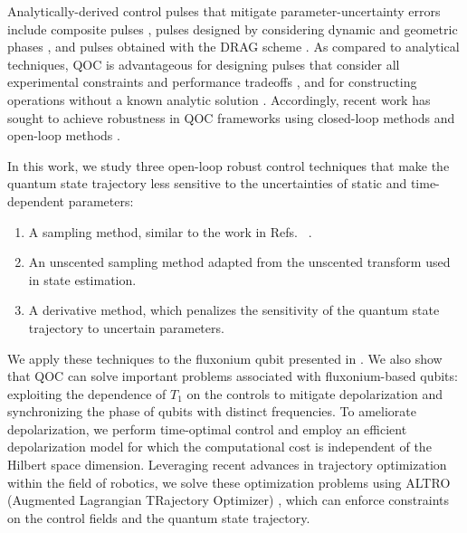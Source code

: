 \documentclass[
  amsfonts,
  amsmath,
  amssymb,
  pra,
  twocolumn,
  superscriptaddress,
]{revtex4-2}
\begin{document}
Analytically-derived control pulses that mitigate parameter-uncertainty
errors include composite pulses \cite{cummins2000use, cummins2003tackling,
  kupce1995stretched, merrill2014progress},
pulses designed by considering dynamic and geometric phases
\cite{han2020experimental, xu2020nonadiabatic, dridi2020optimal}, and
pulses obtained with the DRAG scheme \cite{motzoi2009simple}.
As compared to analytical techniques, QOC is advantageous for
designing pulses that consider all experimental constraints and
performance tradeoffs
\cite{leung2017speedup},
and for constructing operations without a known analytic solution
\cite{chakram2020multimode, heeres2017implementing}.
Accordingly, recent work has sought to achieve robustness in QOC
frameworks using closed-loop methods
\cite{egger2014adaptive, feng2018gradient,
  li2017hybrid, wittler2020integrated, pechen2012trap}
and open-loop methods
\cite{ball2020software, carvalho2020error, allen2019robust, reinhold2019controlling,
  rembold2020introduction, kosut2013robust, niu2019universal, khaneja2005optimal,
petersen2013robustness}.

In this work, we study three open-loop robust control techniques that
make the quantum state trajectory less sensitive to the uncertainties
of static and time-dependent parameters:
\begin{enumerate}
\item A sampling method, similar to the work in Refs.~
  \cite{allen2019robust, khaneja2005optimal, reinhold2019controlling, rembold2020introduction}.
\item An unscented sampling method \cite{howell2020direct, lee2013sigma, thangavel2020robust}
  adapted from the unscented transform \cite{julier2004unscented,
    uhlmann1995dynamic} used in state estimation.
  \item A derivative method, which penalizes the sensitivity of the quantum state trajectory
    to uncertain parameters.
\end{enumerate}
We apply these techniques to the fluxonium qubit presented in \cite{zhang2020universal}.
We also show that QOC can solve important problems associated with
fluxonium-based qubits: exploiting the dependence of $T_{1}$ on the controls
to mitigate depolarization
and synchronizing the phase of qubits with distinct frequencies.
To ameliorate depolarization,
we perform time-optimal control and
employ an efficient depolarization model
for which the computational cost is independent of the
Hilbert space dimension.
Leveraging recent advances in trajectory optimization within the field of robotics, we
solve these optimization problems using ALTRO (Augmented Lagrangian TRajectory Optimizer)
\cite{howell2019altro}, which can enforce constraints on
the control fields and the quantum state trajectory.
\end{document}

